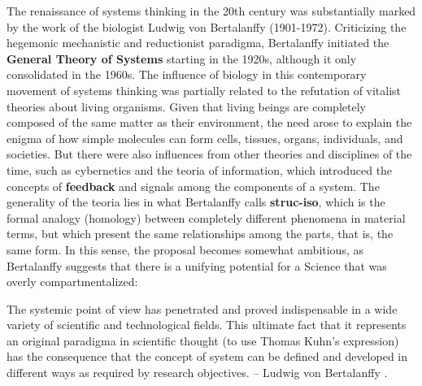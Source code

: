 \documentclass[./main_en.tex]{subfiles}
\begin{document}
\par The renaissance of systems thinking in the 20th century was substantially marked by the work of the biologist Ludwig von Bertalanffy (1901-1972). Criticizing the hegemonic mechanistic and reductionist \gls{paradigma}, Bertalanffy initiated the \textbf{General Theory of Systems} starting in the 1920s, although it only consolidated in the 1960s. The influence of biology in this contemporary movement of systems thinking was partially related to the refutation of vitalist theories about living organisms. Given that living beings are completely composed of the same matter as their environment, the need arose to explain the enigma of how simple molecules can form cells, tissues, organs, individuals, and societies. But there were also influences from other theories and disciplines of the time, such as cybernetics and the \gls{teoria} of information, which introduced the concepts of \textbf{\gls{feedback}} and signals among the components of a \gls{system}. The generality of the \gls{teoria} lies in what Bertalanffy calls \textbf{\gls{struc-iso}}, which is the formal \gls{analogy} (homology) between completely different phenomena in material terms, but which present the same relationships among the parts, that is, the same form. In this sense, the proposal becomes somewhat ambitious, as Bertalanffy suggests that there is a unifying potential for a Science that was overly compartmentalized:
\begin{adjustwidth}{100pt}{0pt}
\medskip
\small The systemic point of view has penetrated and proved indispensable in a wide variety of scientific and technological fields. This ultimate fact that it represents an original \gls{paradigma} in scientific thought (to use Thomas Kuhn's expression) has the consequence that the concept of \gls{system} can be defined and developed in different ways as required by research objectives. -- Ludwig von Bertalanffy \cite{bertalanffy}.
\medskip
\end{adjustwidth}
\end{document}
